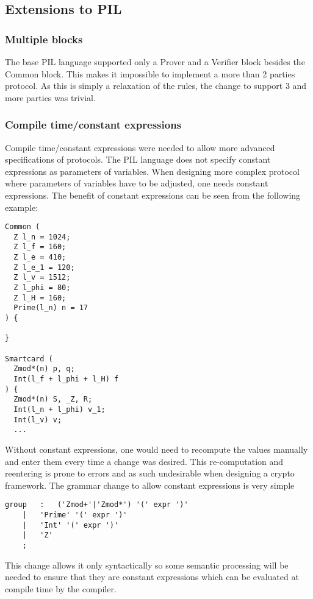 \newpage

\subsection{Extensions to PIL}

\subsubsection{Multiple blocks}

The base PIL language supported only a Prover and a Verifier block
besides the Common block. This makes it impossible to implement a more
than 2 parties protocol. As this is simply a relaxation of the rules,
the change to support 3 and more parties was trivial.

\subsubsection{Compile time/constant expressions}

Compile time/constant expressions were needed to allow more advanced
specifications of protocols. The PIL language does not specify
constant expressions as parameters of variables. When designing more
complex protocol where parameters of variables have to be adjusted,
one needs constant expressions. The benefit of constant expressions
can be seen from the following example:
\begin{lstlisting}[language=PIL]
Common (
  Z l_n = 1024;
  Z l_f = 160;
  Z l_e = 410;
  Z l_e_1 = 120;
  Z l_v = 1512;
  Z l_phi = 80;
  Z l_H = 160;
  Prime(l_n) n = 17
) {

}

Smartcard (
  Zmod*(n) p, q;
  Int(l_f + l_phi + l_H) f
) {
  Zmod*(n) S, _Z, R;
  Int(l_n + l_phi) v_1;
  Int(l_v) v;
  ...
\end{lstlisting}
Without constant expressions, one would need to recompute the values
manually and enter them every time a change was desired. This
re-computation and reentering is prone to errors and as such
undesirable when designing a crypto framework. The grammar change to
allow constant expressions is very simple
\begin{lstlisting}[language=grammar, keywords={group, expr}]
group	:	('Zmod+'|'Zmod*') '(' expr ')' 
	|	'Prime' '(' expr ')'
	|	'Int' '(' expr ')'
	|	'Z'
	;
\end{lstlisting}
This change allows it only syntactically so some semantic processing
will be needed to ensure that they are constant expressions which can
be evaluated at compile time by the compiler.

